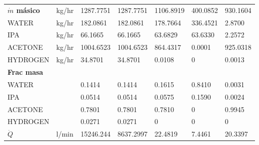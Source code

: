 \begin{table}[H]
\begin{tabular}{lllllll}
    \textbf{$\dot{m}$ másico}     & kg/hr   & 1287.7751  & 1287.7751 & 1106.8919 & 400.0852    & 930.1604  \\
    WATER          & kg/hr   & 182.0861   & 182.0861  & 178.7664  & 336.4521    & 2.8700    \\
    IPA            & kg/hr   & 66.1665    & 66.1665   & 63.6829   & 63.6330     & 2.2572    \\
    ACETONE        & kg/hr   & 1004.6523  & 1004.6523 & 864.4317  & 0.0001      & 925.0318  \\
    HYDROGEN       & kg/hr   & 34.8701    & 34.8701   & 0.0108    & 0           & 0.0013    \\
    \textbf{Frac masa} &         &            &           &           &             &           \\
    WATER          &         & 0.1414     & 0.1414    & 0.1615    & 0.8410      & 0.0031    \\
    IPA            &         & 0.0514     & 0.0514    & 0.0575    & 0.1590      & 0.0024    \\
    ACETONE        &         & 0.7801     & 0.7801    & 0.7810    & 0           & 0.9945    \\
    HYDROGEN       &         & 0.0271     & 0.0271    & 0         & 0           & 0         \\
    $\dot{Q}$   & l/min   & 15246.244 & 8637.2997 & 22.4819   & 7.4461      & 20.3397 \\  \hline
    \end{tabular}
\end{table}